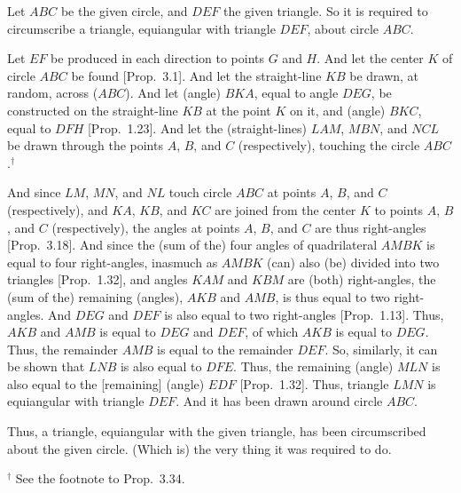 \begin{Parallel}{}{}
{Let $ABC$ be the given circle, and $DEF$ the given triangle. So it is required
to circumscribe a triangle, equiangular with triangle  $DEF$, about circle $ABC$.

Let $EF$ be produced in each direction to points $G$ and 
$H$. And
let the center $K$ of circle $ABC$ be found [Prop.~3.1].
And let the straight-line $KB$ be drawn, at random,  across ($ABC$).
And let (angle) $BKA$, equal to angle $DEG$, be constructed on the straight-line $KB$ at the point $K$ on it, and (angle) $BKC$, equal to
$DFH$ [Prop.~1.23]. And let the (straight-lines) $LAM$, $MBN$, and $NCL$ be 
drawn through the points $A$, $B$, and $C$ (respectively), touching the circle $ABC$.$^\dag$

And since $LM$, $MN$, and $NL$ touch circle $ABC$ at points $A$, $B$, and $C$
(respectively), and $KA$, $KB$, and $KC$ are joined from the center $K$
to  points $A$, $B$, and $C$ (respectively), the angles at points
$A$, $B$, and $C$ are thus right-angles [Prop.~3.18]. And
since the (sum of the) four angles of quadrilateral $AMBK$ is equal to
four right-angles,
inasmuch as $AMBK$ (can) also (be) divided into two triangles [Prop.~1.32],
and angles $KAM$ and $KBM$ are (both) right-angles, the (sum of the) remaining (angles), $AKB$ and $AMB$, is thus equal to two right-angles. 
And $DEG$ and $DEF$ is also equal to two right-angles [Prop.~1.13].
Thus, $AKB$ and $AMB$ is equal to $DEG$ and $DEF$, of which $AKB$ is
equal to $DEG$. Thus, the remainder $AMB$ is equal to the remainder $DEF$.
So, similarly, it can be shown that $LNB$ is also equal to $DFE$. Thus, the
remaining (angle) $MLN$ is also equal to the [remaining] (angle) $EDF$ [Prop.~1.32]. Thus,
triangle $LMN$ is equiangular with triangle $DEF$. And it has been drawn around
circle $ABC$.

Thus,  a triangle, equiangular with  the given triangle, has been circumscribed about the given
circle. (Which is) the very thing it was required to do.}
\end{Parallel}
{\footnotesize \noindent$^\dag$ See the footnote
to Prop.~3.34.}

